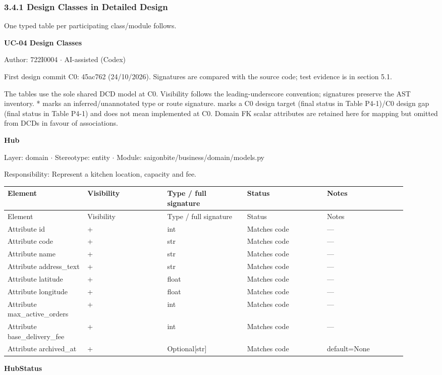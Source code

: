 \subsubsection*{3.4.1 Design Classes in Detailed Design}
One typed table per participating class/module follows.

\textbf{UC-04 Design Classes}

Author: 722I0004 \ensuremath{\cdot} AI-assisted (Codex)

First design commit C0: 45ac762 (24/10/2026). Signatures are compared with the source code; test evidence is in section 5.1.

The tables use the sole shared DCD model at C0. Visibility follows the leading-underscore convention; signatures preserve the AST inventory. * marks an inferred/unannotated type or route signature.  marks a C0 design target (final status in Table P4-1)/C0 design gap (final status in Table P4-1) and does not mean implemented at C0. Domain FK scalar attributes are retained here for mapping but omitted from DCDs in favour of associations.

\textbf{Hub}

Layer: domain \ensuremath{\cdot} Stereotype: \guillemotleft{}entity\guillemotright{} \ensuremath{\cdot} Module: saigonbite/business/domain/models.py

Responsibility: Represent a kitchen location, capacity and fee.

\begin{longtable}{>{\raggedright\arraybackslash}p{0.1840\linewidth}>{\raggedright\arraybackslash}p{0.1840\linewidth}>{\raggedright\arraybackslash}p{0.1840\linewidth}>{\raggedright\arraybackslash}p{0.1840\linewidth}>{\raggedright\arraybackslash}p{0.1840\linewidth}}
Element & Visibility & Type / full signature & Status & Notes \\
\hline\endfirsthead
Element & Visibility & Type / full signature & Status & Notes \\
\hline\endhead
Attribute id & + & int & Matches code & --- \\
Attribute code & + & str & Matches code & --- \\
Attribute name & + & str & Matches code & --- \\
Attribute address\_text & + & str & Matches code & --- \\
Attribute latitude & + & float & Matches code & --- \\
Attribute longitude & + & float & Matches code & --- \\
Attribute max\_active\_orders & + & int & Matches code & --- \\
Attribute base\_delivery\_fee & + & int & Matches code & --- \\
Attribute archived\_at & + & Optional[str] & Matches code & default=None \\
\end{longtable}
\textbf{HubStatus}

